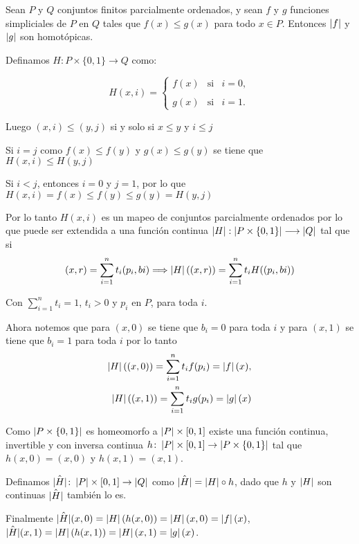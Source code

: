 \begin{Teo}
Sean $P$ y $Q$ conjuntos finitos parcialmente ordenados, y sean $f$ y
$g$ funciones simpliciales de $P$ en $Q$ tales que $f(x)\leq g(x)$
para todo $x\in P$. Entonces $\left| f \right|$ y $\left| g \right|$ son homotópicas.
\end{Teo}
\begin{Dem}

Definamos $H\colon P\times \{ 0,1\} \rightarrow Q$ como:

\begin{equation}
H(x,i)= \left\{ \begin{array}{lcc}
              f(x)&   \text{si} &i=0,  \\
             \\ g(x) &  \text{si}& i=1. 
             \end{array}
    \right. \label{eq:1}
  \end{equation}

  Luego $(x,i) \leq (y,j)$ si y solo si $x\leq y$ y $i\leq j$

Si $i=j$ como $f(x)\leq f(y)$ y $g(x)\leq g(y)$ se tiene que $H(x,i)\leq H(y,j)$

Si $i<j$, entonces $i = 0$ y $j = 1$, por lo que
$H(x,i) = f(x)\leq f(y)\leq g(y) = H(y,j)$

Por lo tanto $H(x,i)$ es un mapeo de conjuntos parcialmente ordenados por lo que puede ser extendida a una función continua $\left| H \right|:\left| P\times \{ 0,1\} \right| \longrightarrow \left| Q \right|$ tal que si
\[
(x,r) =\sum_{i=1}^{n}t_{i}(p_{i},b{i}) \Longrightarrow \left| H \right|((x,r))= \sum_{i=1}^{n}t_{i}H((p_{i},b{i}))
\]

Con $\sum_{i=1}^{n}t_{i}=1$, $t_{i}>0$ y $p_{i}$ en $P$, para toda $i$.

Ahora notemos que para $(x,0)$ se tiene que  $b_{i}=0$ para toda $i$ y para $(x,1)$ se tiene que $ b_{i} = 1$ para toda $i$ por lo tanto
\begin{eqnarray}
\left| H \right|((x,0)) =\sum_{i=1}^{n}t_{i}f(p_{i}) = \left| f \right|(x),\\
\left| H \right|((x,1)) =\sum_{i=1}^{n}t_{i}g(p_{i}) = \left| g \right|(x)
\end{eqnarray}

Como $\left| P\times\{0,1\} \right|$ es homeomorfo a $\left| P \right|\times[0,1]$ existe una función continua, invertible y con inversa continua $h\colon\left| P \right|\times[0,1]\rightarrow \left| P\times\{0,1\} \right|$ tal que $h(x,0) = (x,0)$ y $h(x,1) = (x,1)$.

Definamos $\hat{\left| H \right|}\colon\left| P \right|\times[0,1]\to \left| Q \right|$ como $\hat{\left| H \right|} =  \left| H \right| \circ h$, dado que $h$ y $\left| H \right|$ son continuas $\hat{\left| H \right|}$ también lo es.

Finalmente 
$\hat{\left| H \right|}(x,0)= \left| H \right|(h(x,0))=\left| H \right|(x,0) = \left| f \right|(x)$,
$\hat{\left| H \right|}(x,1)= \left| H \right|(h(x,1))=\left| H \right|(x,1) = \left| g \right|(x)$.
\end{Dem}

